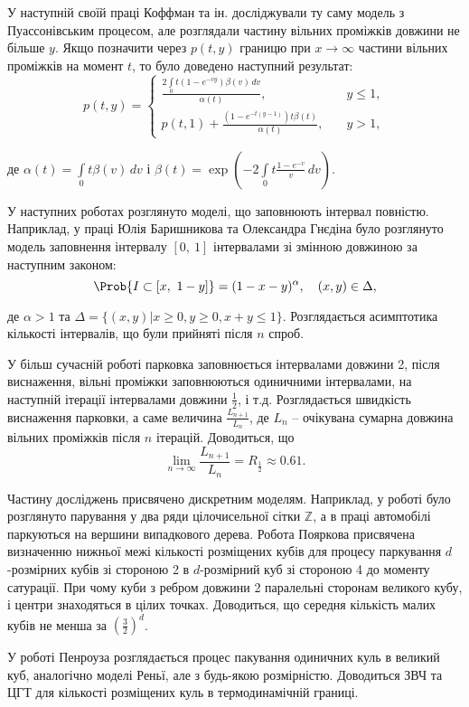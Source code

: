 У наступній своїй праці \cite{coffman2000parking} Коффман та ін. досліджували ту саму модель з Пуассонівським процесом, але розглядали частину вільних проміжків довжини не більше $y$. Якщо позначити через $p(t,y)$ границю при $x \rightarrow \infty$ частини вільних проміжків на момент $t$, то було доведено наступний результат:
\begin{equation}
p(t,y)=\begin{cases}
\frac{2\int\limits_{0}{t} (1 - e^{-vy})\beta(v)\,dv}{\alpha(t)}, &\quad y \leq 1,\\
p(t,1) + \frac{(1 - e^{-t(y-1)})t\beta(t)}{\alpha(t)}, &\quad y > 1,
\end{cases}
\end{equation}

де $\alpha(t) = \int\limits_{0}{t}\beta(v)\,dv$ і $\beta(t) = \exp\left(-2\int\limits_{0}{t} \frac{1 - e^{-v}}{v}\,dv\right)$.

У наступних роботах розглянуто моделі, що заповнюють інтервал повністю. Наприклад, у праці Юлія Баришникова та Олександра Гнєдіна \cite{baryshnikov1962} було розглянуто модель заповнення інтервалу $[0,~1]$ інтервалами зі змінною довжиною за наступним законом:
\begin{equation}
\Prob{I \subset [x,~ 1 - y]} = (1 - x - y)^\alpha, \quad (x,y) \in \Delta,
\end{equation}

де $\alpha > 1$ та $\Delta =\{(x,y)| x \geq 0, y \geq 0, x + y \leq 1 \}$. Розглядається асимптотика кількості інтервалів, що були прийняті після $n$ спроб.

У більш сучасній роботі \cite{exhaustion2017mackey} парковка заповнюється інтервалами довжини 2, після виснаження, вільні проміжки заповнюються одиничними інтервалами, на наступній ітерації інтервалами довжини $\frac{1}{2}$, і т.д. Розглядається швидкість виснаження парковки, а саме величина $\frac{L_{n+1}}{L_{n}}$, де $L_{n}$ -- очікувана сумарна довжина вільних проміжків після $n$ ітерацій. Доводиться, що
\begin{equation}
\lim\limits_{n \rightarrow \infty} \frac{L_{n+1}}{L_{n}} = R_{\frac{1}{2}} \approx 0.61.
\end{equation}

Частину досліджень присвячено дискретним моделям. Наприклад, у роботі \cite{fleurke2009} було розглянуто парування у два ряди цілочисельної сітки $\mathbb{Z}$, а в праці \cite{dehling2008} автомобілі паркуються на вершини випадкового дерева. Робота Пояркова присвячена визначенню нижньої межі кількості розміщених кубів для процесу паркування $d$-розмірних кубів зі стороною 2 в $d$-розмірний куб зі стороною 4 до моменту сатурації. При чому куби з ребром довжини 2 паралельні сторонам великого кубу, і центри знаходяться в цілих точках. Доводиться, що середня кількість малих кубів не менша за $\left(\frac{3}{2}\right)^d$.

У роботі Пенроуза \cite{penrose2002} розглядається процес пакування одиничних куль в великий куб, аналогічно моделі Реньї, але з будь-якою розмірністю. Доводиться ЗВЧ та ЦГТ для кількості розміщених куль в термодинамічній границі.

\nocite{*}
